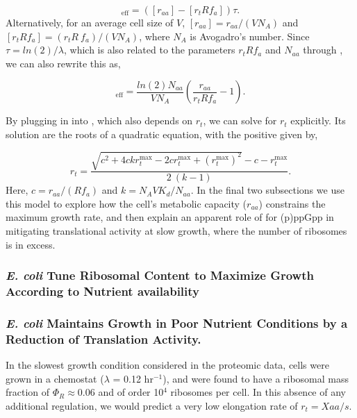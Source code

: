 \begin{equation}
[AA]_{\text{eff}} =  ([r_{aa}] - [r_t R f_a]) \tau.
\end{equation}
Alternatively, for an average cell size of $V$,  $[r_{aa}] = r_{aa}/(V N_A)$
and $[r_t R f_a] = (r_t R \ f_a)/(V N_A)$, where $N_A$ is Avogadro's
number. Since $\tau = ln(2)/\lambda$, which is also related to the parameters
$r_t R f_a$ and $N_{aa}$ through , we
can also rewrite this as,

\begin{equation}
[AA]_{\text{eff}} = \frac{ln(2) N_{aa}}{V N_A} \left(\frac{r_{aa}}{r_t R f_a} - 1 \right) .
\label{eq:aa_final}
\end{equation}



By plugging in  into , which also depends on $r_t$, we
can solve for $r_t$ explicitly. Its solution are the roots of a quadratic equation,
with the positive given by,

\begin{equation}
r_t = \frac{\sqrt{c^2 + 4 c k r_{t}^{\text{max}} - 2 c r_{t}^{\text{max}} + (r_{t}^{\text{max}})^2} - c - r_{t}^{\text{max}}}{2 \ (k-1)}.
\label{eq:rt_final}
\end{equation}
Here, $c = r_{aa}/(R f_a)$ and $k = N_A V K_d / N_{aa}$. In the final two
subsections we use this model to explore how the cell's metabolic capacity
($r_{aa}$) constrains the maximum growth rate, and then explain an apparent role
of for (p)ppGpp in mitigating translational activity at slow growth, where the
number of ribosomes is in excess.

\subsubsection{\textit{E. coli} Tune Ribosomal Content to
Maximize Growth According to Nutrient availability}



\subsubsection{\textit{E. coli} Maintains Growth in Poor Nutrient Conditions by a
Reduction of Translation Activity.}

In the slowest growth condition considered in the proteomic data, cells were
grown in a chemostat ($\lambda$ = 0.12 hr$^{-1}$), and were found to have a ribosomal
mass fraction of $\Phi_R \approx 0.06$ and of order 10$^4$ ribosomes per cell.
In this absence of any additional regulation, we would predict a very low elongation rate of $r_t = X aa/s$.

